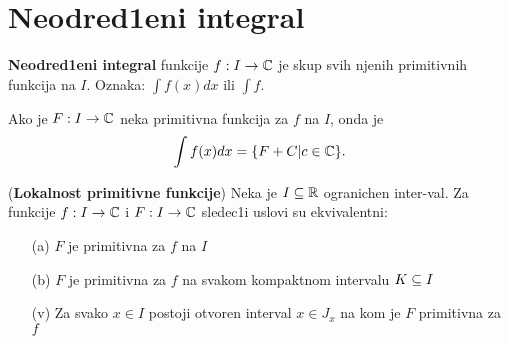 \documentclass[../main.tex]{subfiles}
\begin{document}
\section {Neodred1eni integral}
\begin{de}
\textbf{Neodred1eni integral} funkcije $f:I \to \mathbb{C}$ je skup svih njenih
primitivnih funkcija na $I$. Oznaka: $\int f(x) dx$ ili $\int f$.
\end{de}
Ako je $F:I \to \mathbb{C}$ neka primitivna funkcija za $f$ na $I$, onda
je $$\int f(x) dx = \{F+C | c \in \mathbb{C}\}.$$
\begin{tvr}
(\textbf{Lokalnost primitivne funkcije}) Neka je $I\subseteq \mathbb{R}$ ogranichen inter-val.
Za funkcije $f:I\to \mathbb{C}$ i $F:I \to \mathbb{C}$ sledec1i uslovi su ekvivalentni:
\begin{itemize}
        \item[(a)] $F$ je primitivna za $f$ na $I$
        \item[(b)] $F$ je primitivna za $f$ na svakom kompaktnom
        intervalu $K\subseteq I$
        \item[(v)] Za svako $x \in I$ postoji otvoren interval $x \in J_x$ na kom je $F$ primitivna za $f$
\end{itemize} 
\end{tvr}
\end{document}
